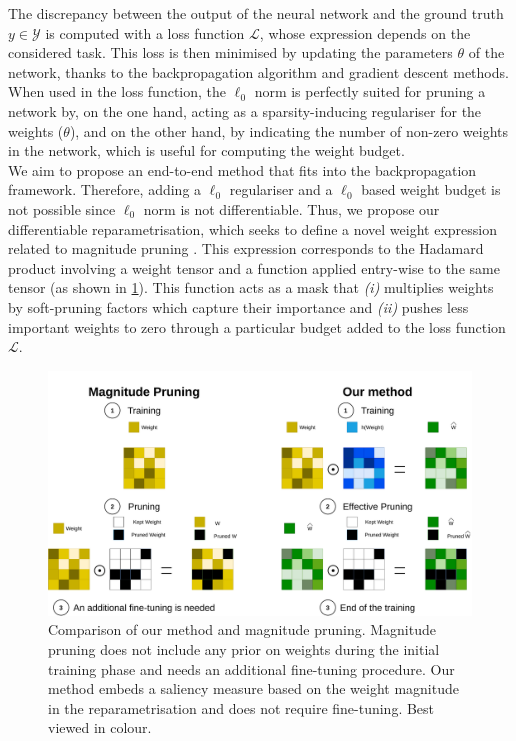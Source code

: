 The discrepancy between the output of the neural network and the ground truth $y
\in \mathcal{Y}$ is computed with a loss function $\mathcal{L}$, whose
expression depends on the considered task. This loss is then minimised by
updating the parameters $\theta$ of the network, thanks to the backpropagation
algorithm \cite{rumelhart1985learning,rumelhart1986learning} and gradient
descent methods.\\

When used in the loss function, the $\ell_0$ norm is perfectly suited for
pruning a network by, on the one hand, acting as a sparsity-inducing regulariser
for the weights ($\theta$), and on the other hand, by indicating the number of
non-zero weights in the network, which is useful for computing the weight
budget. \\

We aim to propose an end-to-end method that fits into the backpropagation
framework. Therefore, adding a $\ell_0$ regulariser and a $\ell_0$ based weight budget
is not possible since $\ell_0$ norm is not differentiable. Thus, we propose our
differentiable reparametrisation, which seeks to define a novel weight
expression related to magnitude pruning
\cite{DBLP:conf/nips/CunDS89,DBLP:conf/nips/HanPTD15}. This expression
corresponds to the Hadamard product involving a weight tensor and a function
applied entry-wise to the same tensor (as shown in
\cref{fig:chap1:comparison_reparam_vs_mag_pruning}). This function acts as a
mask that \emph{(i)} multiplies weights by soft-pruning factors which capture their
importance and \emph{(ii)} pushes less important weights to zero through a particular
budget added to the loss function $\mathcal{L}$. \\

\begin{figure}[ht]
  \centerline{\includegraphics[width=12.5cm]{chapter_1/assets/comparison_reparam_vs_mag_pruning.pdf}}
  \caption{Comparison of our method and magnitude pruning. Magnitude pruning
  does not include any prior on weights during the initial training phase and
  needs an additional fine-tuning procedure. Our method embeds a saliency
  measure based on the weight magnitude in the reparametrisation and does not
  require fine-tuning. Best viewed in colour.}
  \label{fig:chap1:comparison_reparam_vs_mag_pruning}
\end{figure}


